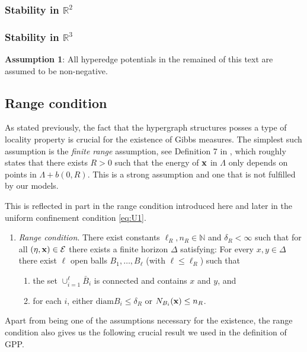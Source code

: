 \subsubsection{Stability in $\mathbb R^2$}
\tbd
\subsubsection{Stability in $\mathbb R^3$}
\tbd
{}

\noindent \textbf{Assumption 1}: All hyperedge potentials in the remained of this text are assumed to be non-negative.

\subsection{Range condition} \label{sec:range}
As stated previously, the fact that the hypergraph structures posses a type of locality property is crucial for the existence of Gibbs measures. The simplest such assumption is the \textit{finite range} assumption, see Definition 7 in \cite{Dereudre2017}, which roughly states that there exists $R>0$ such that the energy of ${\mathbf{x}}$ in $\Lambda$ only depends on points in $\Lambda + b(0,R)$. This is a strong assumption and one that is not fulfilled by our models. 

This is reflected in part in the range condition introduced here and later in the uniform confinement condition \ref{eq:U1}.

\begin{enumerate}[\textbf{(R)}]\label{(R)}
	\item \textit{Range condition}. There exist constants $\ell_R,n_R \in \mathbb N$ and $\delta_R < \infty$ such that for all $(\eta,{\mathbf{x}}) \in \mathcal E$ there exists a finite horizon $\Delta$ satisfying: For every $x,y \in \Delta$ there exist $\ell$ open balls $B_1, \dots, B_\ell$ (with $\ell \leq \ell_R$) such that
	\begin{enumerate}[-]
		\item the set $\cup^\ell_{i=1} \bar B_i$ is connected and contains $x$ and $y$, and 
		\item for each $i$, either $\text{diam} B_i \leq \delta_R$ or $N_{B_i}({\mathbf{x}}) \leq n_R$.
	\end{enumerate}
\end{enumerate}


Apart from being one of the assumptions necessary for the existence, the range condition also gives us the following crucial result we used in the definition of GPP.

